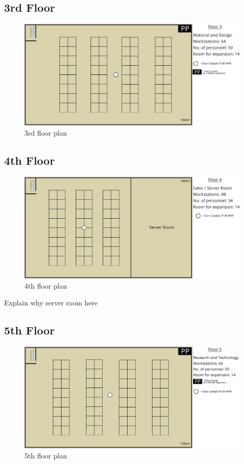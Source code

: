 \subsection{3rd Floor}
\begin{figure}[H]
    \includegraphics[width=15cm]{Figures/3rd-Floor.png}
    \caption{3rd floor plan}
    \label{fig:3rd_floor}
\end{figure}
\subsection{4th Floor}
\begin{figure}[H]
    \includegraphics[width=15cm]{Figures/4th-Floor.png}
    \caption{4th floor plan}
    \label{fig:4th_floor}
\end{figure}
Explain why server room here
\subsection{5th Floor}
\begin{figure}[H]
    \includegraphics[width=15cm]{Figures/5th-Floor.png}
    \caption{5th floor plan}
    \label{fig:5th_floor}
\end{figure}
